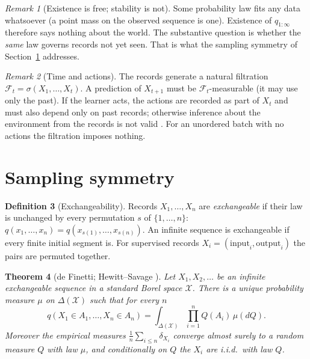 \documentclass[11pt]{article}
\theoremstyle{definition}
\newtheorem{definition}{Definition}[section]
\theoremstyle{plain}
\newtheorem{theorem}[definition]{Theorem}
\theoremstyle{remark}
\newtheorem{remark}[definition]{Remark}
\newcommand{\X}{\mathcal{X}}
\newcommand{\Prob}{\Delta}
\begin{document}
\begin{remark}[Existence is free; stability is not]
Some probability law fits any data whatsoever (a point mass on the
observed sequence is one). Existence of $q_{1:\infty}$ therefore says
nothing about the world. The substantive question is whether the
\emph{same} law governs records not yet seen. That is what the
sampling symmetry of Section~\ref{sec:sampling} addresses.
\end{remark}

\begin{remark}[Time and actions]
The records generate a natural filtration
$\mathcal F_t = \sigma(X_1,\dots,X_t)$. A prediction of $X_{t+1}$ must
be $\mathcal F_t$-measurable (it may use only the past). If the learner
acts, the actions are recorded as part of $X_t$ and must also depend
only on past records; otherwise inference about the environment from
the records is not valid \cite{rubin1976}. For an unordered batch with
no actions the filtration imposes nothing.
\end{remark}

\section{Sampling symmetry}\label{sec:sampling}

\begin{definition}[Exchangeability]
Records $X_1,\dots,X_n$ are \emph{exchangeable} if their law is
unchanged by every permutation $s$ of $\{1,\dots,n\}$:
$q(x_1,\dots,x_n) = q(x_{s(1)},\dots,x_{s(n)})$. An infinite sequence
is exchangeable if every finite initial segment is. For supervised
records $X_i=(\mathrm{input}_i,\mathrm{output}_i)$ the pairs are
permuted together.
\end{definition}

\begin{theorem}[de Finetti; Hewitt--Savage \cite{hewitt1955,kallenberg2005}]
\label{thm:definetti}
Let $X_1, X_2,\dots$ be an infinite exchangeable sequence in a
standard Borel space $\X$. There is a unique probability measure $\mu$
on $\Prob(\X)$ such that for every $n$
\[
q(X_1\in A_1,\dots,X_n\in A_n) = \int_{\Prob(\X)} \prod_{i=1}^n Q(A_i)\,\mu(dQ).
\]
Moreover the empirical measures $\frac1n\sum_{i\le n}\delta_{X_i}$
converge almost surely to a random measure $Q$ with law $\mu$, and
conditionally on $Q$ the $X_i$ are i.i.d.\ with law $Q$.
\end{theorem}
\end{document}
